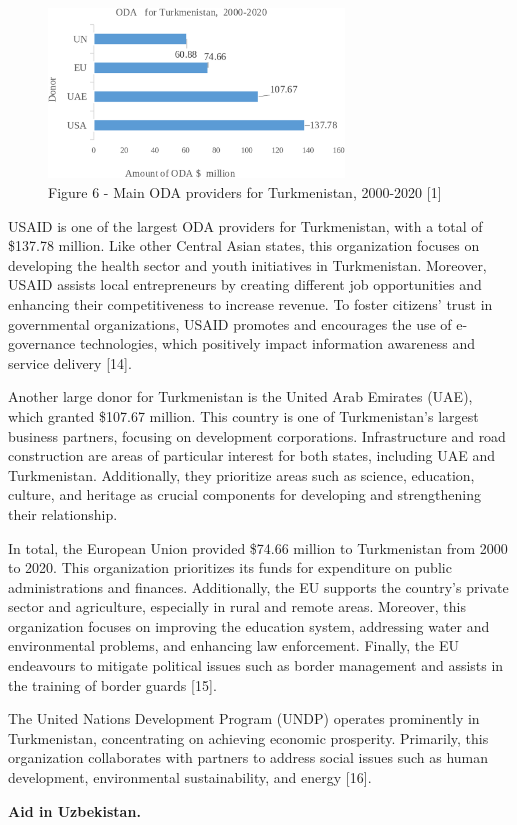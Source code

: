 \begin{figure}[H]
	\centering
	\includegraphics[width=0.7\textwidth]{assets/341.5}
	\caption*{Figure 6 - Main ODA providers for Turkmenistan, 2000-2020
{[}1{]}}
\end{figure}

\begin{multicols}{2}
USAID is one of the largest ODA providers for Turkmenistan, with a total
of \$137.78 million. Like other Central Asian states, this organization
focuses on developing the health sector and youth initiatives in
Turkmenistan. Moreover, USAID assists local entrepreneurs by creating
different job opportunities and enhancing their competitiveness to
increase revenue. To foster citizens' trust in governmental
organizations, USAID promotes and encourages the use of e-governance
technologies, which positively impact information awareness and service
delivery {[}14{]}.

Another large donor for Turkmenistan is the United Arab Emirates (UAE),
which granted \$107.67 million. This country is one of Turkmenistan's
largest business partners, focusing on development corporations.
Infrastructure and road construction are areas of particular interest
for both states, including UAE and Turkmenistan. Additionally, they
prioritize areas such as science, education, culture, and heritage as
crucial components for developing and strengthening their relationship.

In total, the European Union provided \$74.66 million to Turkmenistan
from 2000 to 2020. This organization prioritizes its funds for
expenditure on public administrations and finances. Additionally, the EU
supports the country's private sector and agriculture, especially in
rural and remote areas. Moreover, this organization focuses on improving
the education system, addressing water and environmental problems, and
enhancing law enforcement. Finally, the EU endeavours to mitigate
political issues such as border management and assists in the training
of border guards {[}15{]}.

The United Nations Development Program (UNDP) operates prominently in
Turkmenistan, concentrating on achieving economic prosperity. Primarily,
this organization collaborates with partners to address social issues
such as human development, environmental sustainability, and energy
{[}16{]}.

{\bfseries Aid in Uzbekistan.}
\end{multicols}

